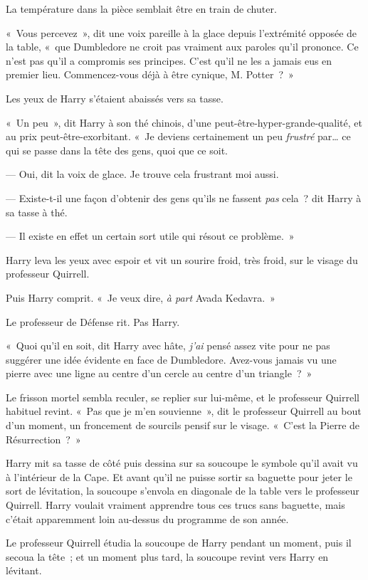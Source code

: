 La température dans la pièce semblait être en train de chuter.

«~Vous percevez~», dit une voix pareille à la glace depuis l'extrémité opposée de la table, «~que Dumbledore ne croit pas vraiment aux paroles qu'il prononce.
Ce n'est pas qu'il a compromis ses principes.
C'est qu'il ne les a jamais eus en premier lieu.
Commencez-vous déjà à être cynique, M. Potter~?~»

Les yeux de Harry s'étaient abaissés vers sa tasse.

«~Un peu~», dit Harry à son thé chinois, d'une peut-être-hyper-grande-qualité, et au prix peut-être-exorbitant.
«~Je deviens certainement un peu \emph{frustré} par… ce qui se passe dans la tête des gens, quoi que ce soit.

--- Oui, dit la voix de glace.
Je trouve cela frustrant moi aussi.

--- Existe-t-il une façon d'obtenir des gens qu'ils ne fassent \emph{pas} cela~? dit Harry à sa tasse à thé.

--- Il existe en effet un certain sort utile qui résout ce problème.~»

Harry leva les yeux avec espoir et vit un sourire froid, très froid, sur le visage du professeur Quirrell.

Puis Harry comprit.
«~Je veux dire, \emph{à part} Avada Kedavra.~»

Le professeur de Défense rit.
Pas Harry.

«~Quoi qu'il en soit, dit Harry avec hâte, \emph{j'ai} pensé assez vite pour ne pas suggérer une idée évidente en face de Dumbledore.
Avez-vous jamais vu une pierre avec une ligne au centre d'un cercle au centre d'un triangle~?~»

Le frisson mortel sembla reculer, se replier sur lui-même, et le professeur Quirrell habituel revint.
«~Pas que je m'en souvienne~», dit le professeur Quirrell au bout d'un moment, un froncement de sourcils pensif sur le visage.
«~C'est la Pierre de Résurrection~?~»

Harry mit sa tasse de côté puis dessina sur sa soucoupe le symbole qu'il avait vu à l'intérieur de la Cape.
Et avant qu'il ne puisse sortir sa baguette pour jeter le sort de lévitation, la soucoupe s'envola en diagonale de la table vers le professeur Quirrell.
Harry voulait vraiment apprendre tous ces trucs sans baguette, mais c'était apparemment loin au-dessus du programme de son année.

Le professeur Quirrell étudia la soucoupe de Harry pendant un moment, puis il secoua la tête~; et un moment plus tard, la soucoupe revint vers Harry en lévitant.

